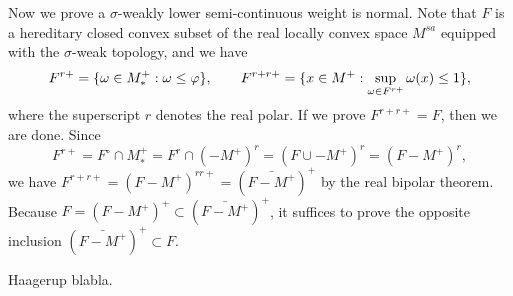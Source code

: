 \documentclass{../../large}
\begin{document}
\begin{pf}
Now we prove a $\sigma$-weakly lower semi-continuous weight is normal.
Note that $F$ is a hereditary closed convex subset of the real locally convex space $M^{sa}$ equipped with the $\sigma$-weak topology, and we have
\[F^{r+}=\{\omega\in M_*^+:\omega\le\varphi\},\qquad
F^{r+r+}=\{x\in M^+:\sup_{\omega\in F^{r+}}\omega(x)\le1\},\]
where the superscript $r$ denotes the real polar.
If we prove $F^{r+r+}=F$, then we are done.
Since
\[F^{r+}=F^\circ\cap M_*^+=F^r\cap(-M^+)^r=(F\cup-M^+)^r=(F-M^+)^r,\]
we have $F^{r+r+}=(F-M^+)^{rr+}=(\bar{F-M^+})^+$ by the real bipolar theorem.
Because $F=(F-M^+)^+\subset(\bar{F-M^+})^+$, it suffices to prove the opposite inclusion $(\bar{F-M^+})^+\subset F$.

Haagerup blabla.

\end{pf}
\end{document}
